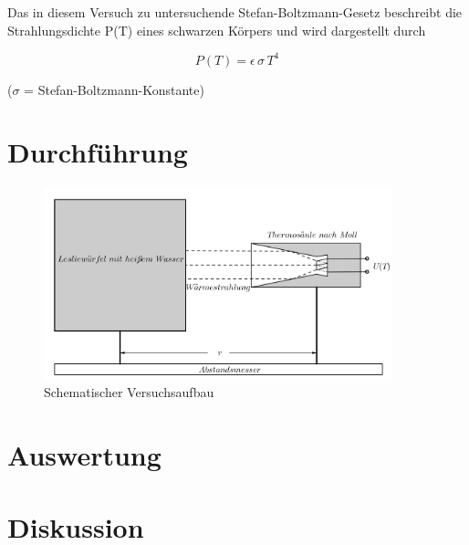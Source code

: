 Das in diesem Versuch zu untersuchende Stefan-Boltzmann-Gesetz beschreibt die Strahlungsdichte P(T) eines schwarzen Körpers und wird
dargestellt durch

\begin{formel}
\begin{equation}
 P(T) = \epsilon \, \sigma \, T^4
 \end{equation}
\caption*{\small{($\sigma$ = Stefan-Boltzmann-Konstante)}}
\label{Boltz}
\end{formel}


\section{Durchführung}


\begin{figure}[H]
 \includegraphics[width=0.9\textwidth]{pics/207b.png}
 \centering
 \caption{Schematischer Versuchsaufbau}
 \label{Aufbau}
\end{figure}

\section{Auswertung}

\section{Diskussion}





